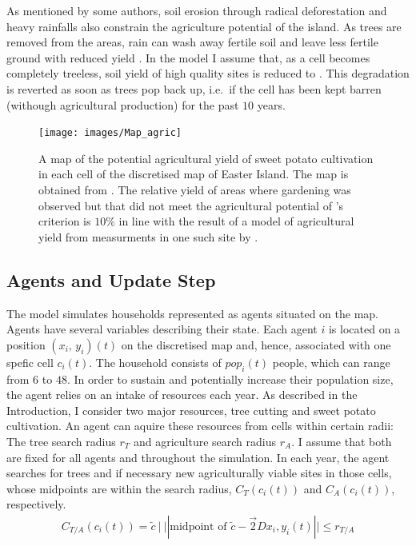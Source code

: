 As mentioned by some authors, soil erosion through radical deforestation and heavy rainfalls also constrain the agriculture potential of the island.
As trees are removed from the areas, rain can wash away fertile soil and leave less fertile ground with reduced yield \citet{Bahn2017} \TODO.
In the model I assume that, as a cell becomes completely treeless, soil yield of high quality sites is reduced to \TODO. 
This degradation is reverted as soon as trees pop back up, i.e.\ if the cell has been kept barren (withough agricultural production) for the past $10$ years.
\begin{figure}
	\centering
	\texttt{[image: images/Map\_agric]}
	\caption{A map of the potential agricultural yield of sweet potato cultivation in each cell of the discretised map of Easter Island. The map is obtained from \citet{Pulestion2017}. The relative yield of areas where gardening was observed but that did not meet the agricultural potential of \citet{Puleston2017}'s criterion is $10\%$ in line with the result of a model of agricultural yield from measurments in one such site by \citet{Louwagie2006}.}
	\label{fig:Map_agric}
\end{figure}

\subsection{Agents and Update Step}\label{sec:AgentUpdate}
The model simulates households represented as agents situated on the map.
Agents have several variables describing their state.
Each agent $i$ is located on a position $(x_i,\, y_i)(t)$ on the discretised map and, hence, associated with one spefic cell $c_i(t)$.
The household consists of $pop_i(t)$ people, which can range from $6$ to $48$.
In order to sustain and potentially increase their population size, the agent relies on an intake of resources each year.
As described in the Introduction, I consider two major resources, tree cutting and sweet potato cultivation.
An agent can aquire these resources from cells within certain radii: The tree search radius $r_T$ and agriculture search radius $r_A$. 
I assume that both are fixed for all agents and throughout the simulation.
In each year, the agent searches for trees and if necessary new agriculturally viable sites in those cells, whose midpoints are within the search radius, $C_T(c_i(t))$ and $C_A(c_i(t))$, respectively.
\begin{eqnarray}
	C_{T/A}(c_i(t)) = { \tilde{c}\ | \ ||\text{midpoint of } \tilde{c}  - \vec2D{x_i,y_i}(t)|| \leq r_{T/A}}
\end{eqnarray}

